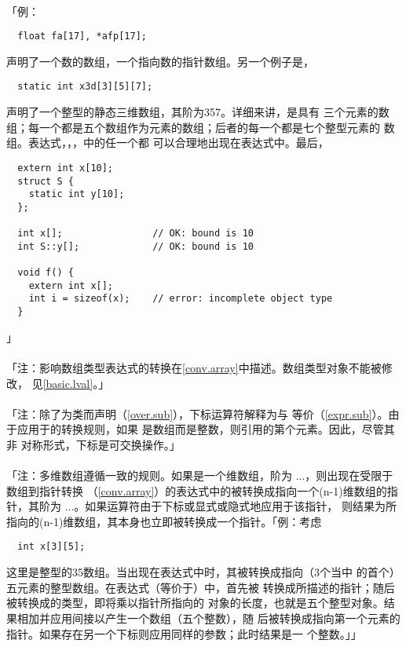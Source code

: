 \paragraph{}
「例：
\begin{lstlisting}
  float fa[17], *afp[17];
\end{lstlisting}
声明了一个数的数组，一个指向数的指针数组。另一个例子是，
\begin{lstlisting}
  static int x3d[3][5][7];
\end{lstlisting}
声明了一个整型的静态三维数组，其阶为3\ttim{}5\ttim{}7。详细来讲，是具有
三个元素的数组；每一个都是五个数组作为元素的数组；后者的每一个都是七个整型元素的
数组。表达式，，，中的任一个都
可以合理地出现在表达式中。最后，
\begin{lstlisting}
  extern int x[10];
  struct S {
    static int y[10];
  };

  int x[];                // OK: bound is 10
  int S::y[];             // OK: bound is 10

  void f() {
    extern int x[];
    int i = sizeof(x);    // error: incomplete object type
  }
\end{lstlisting}」

\paragraph{}
「注：影响数组类型表达式的转换在\ref{conv.array}中描述。数组类型对象不能被修改，
见\ref{basic.lval}。」

\paragraph{}
「注：除了为类而声明（\ref{over.sub}），下标运算符\tm{[]}解释为与
等价（\ref{expr.sub}）。由于应用于\tm{+}的转换规则，如果
是数组而是整数，则引用的第个元素。因此，尽管其非
对称形式，下标是可交换操作。」

\paragraph{}
「注：多维数组遵循一致的规则。如果是一个维数组，阶为
\ttim{}\ttim...\ttim{}，则出现在受限于数组到指针转换
（\ref{conv.array}）的表达式中的被转换成指向一个(n-1)维数组的指针，其阶为
\ttim...\ttim{}。如果\tm{*}运算符由于下标或显式或隐式地应用于该指针，
则结果为所指向的(n-1)维数组，其本身也立即被转换成一个指针。「例：考虑
\begin{lstlisting}
  int x[3][5];
\end{lstlisting}
这里是整型的3\ttim5数组。当出现在表达式中时，其被转换成指向（3个当中
的首个）五元素的整型数组。在表达式（等价于）中，首先被
转换成所描述的指针；随后被转换成的类型，即将乘以指针所指向的
对象的长度，也就是五个整型对象。结果相加并应用间接以产生一个数组（五个整数），随
后被转换成指向第一个元素的指针。如果存在另一个下标则应用同样的参数；此时结果是一
个整数。」」

